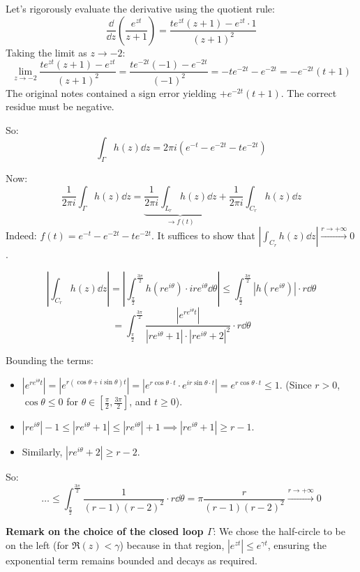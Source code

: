 \begin{verification}[Correction of the derivative limit at $z=-2$]
Let's rigorously evaluate the derivative using the quotient rule:
$$\frac{\dd}{\dd z} \left( \frac{e^{zt}}{z+1} \right) = \frac{t e^{zt}(z+1) - e^{zt} \cdot 1}{(z+1)^2}$$
Taking the limit as $z \rightarrow -2$:
$$\lim_{z\rightarrow-2} \frac{t e^{zt}(z+1) - e^{zt}}{(z+1)^2} = \frac{t e^{-2t}(-1) - e^{-2t}}{(-1)^2} = -t e^{-2t} - e^{-2t} = -e^{-2t}(t+1)$$
The original notes contained a sign error yielding $+e^{-2t}(t+1)$. The correct residue must be negative.
\end{verification}

So: 
$$\int_{\Gamma} h(z) \dd z = 2\pi i (e^{-t} - e^{-2t} - t e^{-2t})$$

Now:
$$\frac{1}{2\pi i} \int_{\Gamma} h(z) \dd z = \underbrace{\frac{1}{2\pi i} \int_{L_r} h(z) \dd z}_{\rightarrow f(t)} + \frac{1}{2\pi i} \int_{C_r} h(z) \dd z$$
Indeed: $f(t) = e^{-t} - e^{-2t} - t e^{-2t}$. It suffices to show that $\left| \int_{C_r} h(z) \dd z \right| \xrightarrow{r\rightarrow+\infty} 0$.

$$\left| \int_{C_r} h(z) \dd z \right| = \left| \int_{\frac{\pi}{2}}^{\frac{3\pi}{2}} h(r e^{i\theta}) \cdot ir e^{i\theta} \dd \theta \right| \le \int_{\frac{\pi}{2}}^{\frac{3\pi}{2}} |h(r e^{i\theta})| \cdot r \dd\theta$$
$$= \int_{\frac{\pi}{2}}^{\frac{3\pi}{2}} \frac{|e^{r e^{i\theta} t}|}{|r e^{i\theta} + 1| \cdot |r e^{i\theta} + 2|^2} \cdot r \dd\theta$$

Bounding the terms:
\begin{itemize}
    \item $|e^{r e^{i\theta} t}| = |e^{r(\cos\theta + i\sin\theta)t}| = |e^{r \cos\theta \cdot t} \cdot e^{ir\sin\theta \cdot t}| = e^{r \cos\theta \cdot t} \le 1$.
    (Since $r > 0$, $\cos\theta \le 0$ for $\theta \in [\frac{\pi}{2}, \frac{3\pi}{2}]$, and $t \ge 0$).
    \item $|r e^{i\theta}| - 1 \le |r e^{i\theta} + 1| \le |r e^{i\theta}| + 1 \implies |r e^{i\theta} + 1| \ge r - 1$.
    \item Similarly, $|r e^{i\theta} + 2| \ge r - 2$.
\end{itemize}

So:
$$\dots \le \int_{\frac{\pi}{2}}^{\frac{3\pi}{2}} \frac{1}{(r-1)(r-2)^2} \cdot r \dd\theta = \pi \frac{r}{(r-1)(r-2)^2} \xrightarrow{r\rightarrow+\infty} 0$$

\textbf{Remark on the choice of the closed loop $\Gamma$}: We chose the half-circle to be on the left (for $\Re(z) < \gamma$) because in that region, $|e^{zt}| \le e^{\gamma t}$, ensuring the exponential term remains bounded and decays as required.

